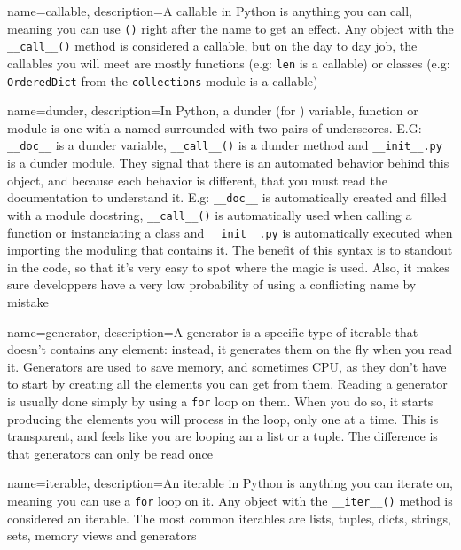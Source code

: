 \makeglossaries



{
    name=callable,
    description={A callable in Python is anything you can call, meaning you can use \lstinline{()} right after the name to get an effect. Any object with the \lstinline{__call__()} method is considered a callable, but on the day to day job, the callables you will meet are mostly functions (e.g: \lstinline{len} is a callable) or classes (e.g: \lstinline{OrderedDict} from the \lstinline{collections} module is a callable)}
}

{
    name=dunder,
    description={In Python, a dunder (for ) variable, function or module is one with a named surrounded with two pairs of underscores. E.G: \lstinline{__doc__} is a dunder variable, \lstinline{__call__()} is a dunder method and \lstinline{__init__.py} is a dunder module. They signal that there is an automated behavior behind this object, and because each behavior is different, that you must read the documentation to understand it. E.g: \lstinline{__doc__} is automatically created and filled with a module docstring, \lstinline{__call__()} is automatically used when calling a function or instanciating a class and \lstinline{__init__.py} is automatically executed when importing the moduling that contains it. The benefit of this syntax is to standout in the code, so that it's very easy to spot where the magic is used. Also, it makes sure developpers have a very low probability of using a conflicting name by mistake}
}

{
    name=generator,
    description={A generator is a specific type of \gls{iterable} that doesn't contains any element: instead, it generates them on the fly when you read it. Generators are used to save memory, and sometimes CPU, as they don't have to start by creating all the elements you can get from them. Reading a generator is usually done simply by using a \lstinline{for} loop on them. When you do so, it starts producing the elements you will process in the loop, only one at a time. This is transparent, and feels like you are looping an a list or a tuple. The difference is that generators can only be read once}
}


{
    name=iterable,
    description={An iterable in Python is anything you can iterate on, meaning you can use a \lstinline{for} loop on it. Any object with the \lstinline{__iter__()} method is considered an iterable. The most common iterables are lists, tuples, dicts, strings, sets, memory views and generators}
}


